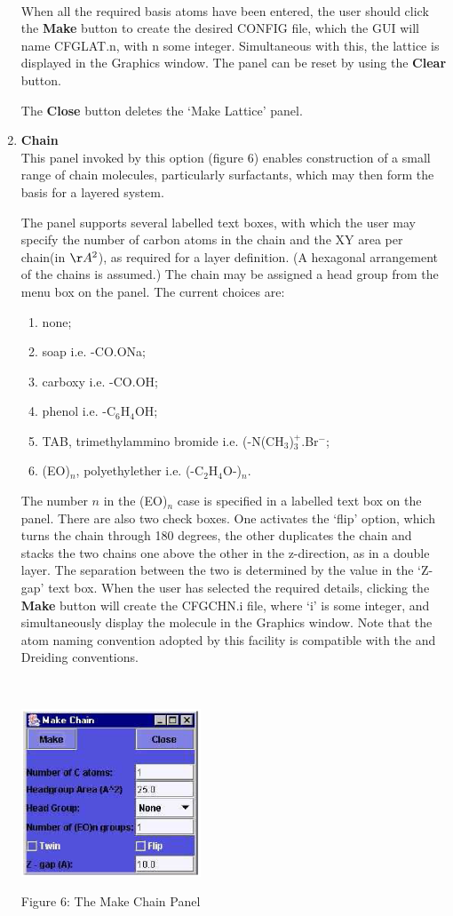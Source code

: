 \begin{enumerate}
~

\noindent 
When all the required basis atoms have been entered, the user should
click the {\bf Make} button to create the desired CONFIG file, which
the GUI will name CFGLAT.n, with n some integer. Simultaneous with
this, the lattice is displayed in the Graphics window. The panel can
be reset by using the {\bf Clear} button. 

The {\bf Close} button deletes the `Make Lattice' panel.

\item {\bf Chain}\\
This panel invoked by this option (figure 6) enables construction of a
small range of chain molecules, particularly surfactants, which may
then form the basis for a layered system.

The panel supports several labelled text boxes, with
which the user may specify the number of carbon atoms in the chain and
the XY area per chain(in $\AA^2$), as required for a layer definition.
(A hexagonal arrangement of the chains is assumed.) The chain may be
assigned a head group from the menu box on the panel. The
current choices are:
\begin{enumerate} 
\item none;
\item soap i.e. -CO.ONa;
\item carboxy i.e.  -CO.OH;
\item phenol i.e. -C$_6$H$_4$OH;
\item TAB, trimethylammino bromide i.e. (-N(CH$_3$)$_3^+$.Br$^-$;
\item (EO)$_n$, polyethylether i.e. (-C$_2$H$_4$O-)$_n$.
\end{enumerate}
The number $n$ in the (EO)$_n$ case is specified in a labelled text
box on the panel. There are also two check boxes. One activates the
`flip' option, which turns the chain through 180 degrees, the other
duplicates the chain and stacks the two chains one above the other in
the z-direction, as in a double layer. The separation between the two
is determined by the value in the `Z-gap' text box. When the user has
selected the required details, clicking the {\bf Make} button will
create the CFGCHN.i file, where `i' is some integer, and
simultaneously display the molecule in the Graphics window. Note that
the atom naming convention adopted by this facility is compatible with
the \DD{} and Dreiding conventions.

~

\vskip 5mm
\centerline{\includegraphics[height=5cm]{chain.ps}}
\centerline{Figure 6: The Make Chain Panel}
\vskip 5mm


\end{enumerate}
